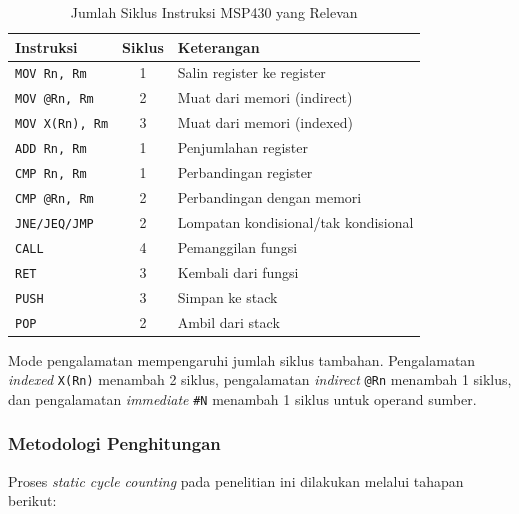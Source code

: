 \begin{table}[htbp]
\centering
\caption{Jumlah Siklus Instruksi MSP430 yang Relevan}
\label{tab:msp430-cycles}
\begin{tabular}{|l|c|l|}
\hline
\textbf{Instruksi} & \textbf{Siklus} & \textbf{Keterangan} \\
\hline
\texttt{MOV Rn, Rm} & 1 & Salin register ke register \\
\texttt{MOV @Rn, Rm} & 2 & Muat dari memori (indirect) \\
\texttt{MOV X(Rn), Rm} & 3 & Muat dari memori (indexed) \\
\texttt{ADD Rn, Rm} & 1 & Penjumlahan register \\
\texttt{CMP Rn, Rm} & 1 & Perbandingan register \\
\texttt{CMP @Rn, Rm} & 2 & Perbandingan dengan memori \\
\texttt{JNE/JEQ/JMP} & 2 & Lompatan kondisional/tak kondisional \\
\texttt{CALL} & 4 & Pemanggilan fungsi \\
\texttt{RET} & 3 & Kembali dari fungsi \\
\texttt{PUSH} & 3 & Simpan ke stack \\
\texttt{POP} & 2 & Ambil dari stack \\
\hline
\end{tabular}
\end{table}

Mode pengalamatan mempengaruhi jumlah siklus tambahan. Pengalamatan \textit{indexed} \texttt{X(Rn)} menambah 2 siklus, pengalamatan \textit{indirect} \texttt{@Rn} menambah 1 siklus, dan pengalamatan \textit{immediate} \texttt{\#N} menambah 1 siklus untuk operand sumber.

\subsubsection{Metodologi Penghitungan}

Proses \textit{static cycle counting} pada penelitian ini dilakukan melalui tahapan berikut:

